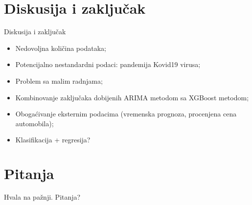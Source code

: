 \documentclass{beamer}
\begin{document}
\section{Diskusija i zaključak}
\begin{frame}{Diskusija i zaključak}
\begin{itemize}
    \item Nedovoljna količina podataka; 
    \item Potencijalno nestandardni podaci: pandemija Kovid19 virusa;
    \item Problem sa malim radnjama;
    \item Kombinovanje zaključaka dobijenih ARIMA metodom sa XGBoost metodom;
    \item Obogaćivanje eksternim podacima (vremenska prognoza, procenjena cena automobila);
    \item Klasifikacija + regresija?
\end{itemize}
\end{frame}

\section{Pitanja}
\begin{frame}
Hvala na pažnji.
\newline
\vspace{30pt}Pitanja?
\end{frame}

%  
% 




\end{document}
